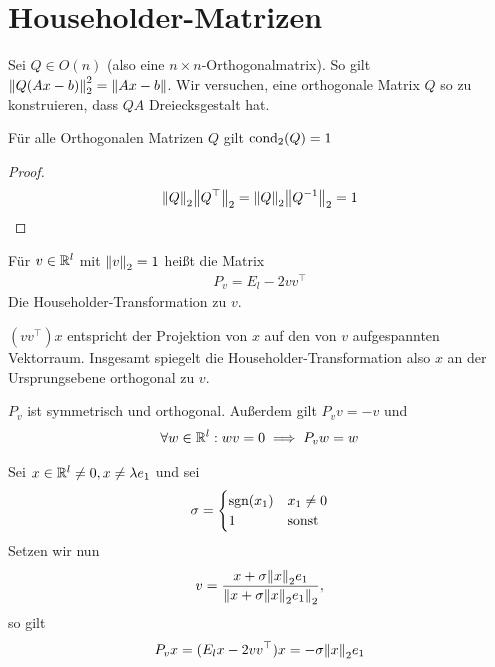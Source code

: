 \documentclass{report}
\begin{document}
\section{Householder-Matrizen}
Sei $Q \in O(n)$ (also eine $n \times n$-Orthogonalmatrix). So gilt $\norm{Q(Ax - b)}_2^2 = \norm{Ax-b}$. Wir versuchen, eine orthogonale Matrix $Q$ so zu konstruieren, dass $QA$ Dreiecksgestalt hat.
\newpar
\begin{lemma}
	Für alle Orthogonalen Matrizen $Q$ gilt $\textnormal{cond}_2(Q) = 1$
\end{lemma}
\begin{proof}
	\begin{align*}
		\norm{Q}_2 \norm{Q^\top}_2 = \norm{Q}_2 \norm{Q^{-1}}_2 = 1
	\end{align*}
\end{proof}
\begin{definition}
	Für $v \in \mathbb{R}^l$ mit $\norm{v}_2 = 1$ heißt die Matrix
	\begin{align*}
		P_v = E_l - 2vv^\top
	\end{align*}
	Die Householder-Transformation zu $v$.
\end{definition}
\noindent $(vv^\top)x$ entspricht der Projektion von $x$ auf den von $v$ aufgespannten Vektorraum. Insgesamt spiegelt die Householder-Transformation also $x$ an der Ursprungsebene orthogonal zu $v$.
\begin{lemma}
	$P_v$ ist symmetrisch und orthogonal. Außerdem gilt $P_vv = -v$ und
	\begin{align*}
		\forall w \in \mathbb{R}^l : wv = 0 \implies P_v w = w
	\end{align*}
\end{lemma}
\begin{lemma}
	Sei $x \in \mathbb{R}^l \neq 0, x \neq \lambda e_1$ und sei
	\begin{align*}
		\sigma = \begin{cases}
			\textnormal{sgn}(x_1) & x_1 \neq 0\\
			1 & \textnormal{sonst}
		\end{cases}
	\end{align*}  
	Setzen wir nun
	\begin{align*}
		v = \frac{x + \sigma \norm{x}_2 e_1}{\norm{x + \sigma \norm{x}_2 e_1}_2},
	\end{align*}
	so gilt
	\begin{align*}
		P_v x = (E_l x - 2vv^\top)x = -\sigma\norm{x}_2 e_1
	\end{align*}
\end{lemma}
\end{document}
